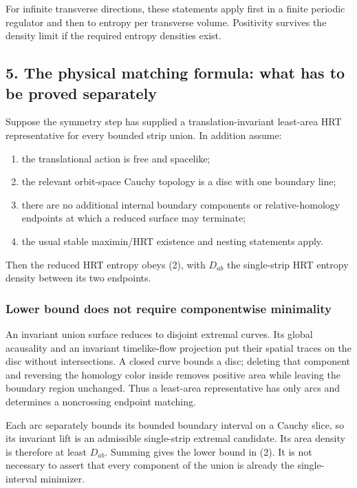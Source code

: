 \documentclass[11pt]{article}
\providecommand{\tightlist}{\setlength{\itemsep}{1pt}\setlength{\parskip}{0pt}}
\begin{document}
For infinite transverse directions, these statements apply first in a
finite periodic regulator and then to entropy per transverse volume.
Positivity survives the density limit if the required entropy densities
exist.

\subsection{5. The physical matching formula: what has to be proved
separately}\label{the-physical-matching-formula-what-has-to-be-proved-separately}

Suppose the symmetry step has supplied a translation-invariant
least-area HRT representative for every bounded strip union. In addition
assume:

\begin{enumerate}
\def\labelenumi{\arabic{enumi}.}
\tightlist
\item
  the translational action is free and spacelike;
\item
  the relevant orbit-space Cauchy topology is a disc with one boundary
  line;
\item
  there are no additional internal boundary components or
  relative-homology endpoints at which a reduced surface may terminate;
\item
  the usual stable maximin/HRT existence and nesting statements apply.
\end{enumerate}

Then the reduced HRT entropy obeys (2), with \(D_{ab}\) the single-strip
HRT entropy density between its two endpoints.

\subsubsection{Lower bound does not require componentwise
minimality}\label{lower-bound-does-not-require-componentwise-minimality}

An invariant union surface reduces to disjoint extremal curves. Its
global acausality and an invariant timelike-flow projection put their
spatial traces on the disc without intersections. A closed curve bounds
a disc; deleting that component and reversing the homology color inside
removes positive area while leaving the boundary region unchanged. Thus
a least-area representative has only arcs and determines a noncrossing
endpoint matching.

Each arc separately bounds its bounded boundary interval on a Cauchy
slice, so its invariant lift is an admissible single-strip extremal
candidate. Its area density is therefore at least \(D_{ab}\). Summing
gives the lower bound in (2). It is not necessary to assert that every
component of the union is already the single-interval minimizer.
\end{document}
